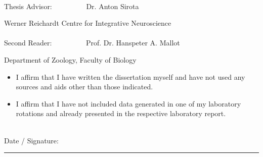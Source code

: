 \textit{}\\[8.4cm]
Thesis Advisor: 	~~~~~~~~~Dr. Anton Sirota

\hspace{38 mm}	 Werner Reichardt Centre for Integrative Neuroscience 	\\


\textit{}\\[.3cm]
Second Reader: 	~~~~~~~~~Prof. Dr. Hanspeter A. Mallot
				
\hspace{38 mm}	Department of Zoology, Faculty of Biology
%
\textit{}\\[.8cm]
\begin{itemize}
 \item{I affirm that I have written the dissertation myself and have not used any sources and aids other than those indicated.}
\item{I affirm that I have not included data generated in one of my laboratory rotations and already presented in the respective laboratory report.}
\end{itemize}
\textit{}\\[0.005cm]
%
Date / Signature: \rule[0.25em]{25em}{0.5pt}
\clearpage %